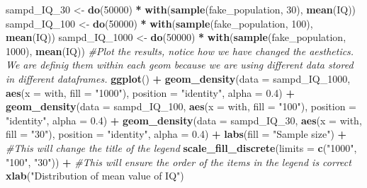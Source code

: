 \documentclass[]{book}
\newenvironment{Shaded}{\begin{snugshade}}{\end{snugshade}}
\newcommand{\CommentTok}[1]{\textcolor[rgb]{0.56,0.35,0.01}{\textit{#1}}}
\newcommand{\DataTypeTok}[1]{\textcolor[rgb]{0.13,0.29,0.53}{#1}}
\newcommand{\DecValTok}[1]{\textcolor[rgb]{0.00,0.00,0.81}{#1}}
\newcommand{\FloatTok}[1]{\textcolor[rgb]{0.00,0.00,0.81}{#1}}
\newcommand{\KeywordTok}[1]{\textcolor[rgb]{0.13,0.29,0.53}{\textbf{#1}}}
\newcommand{\NormalTok}[1]{#1}
\newcommand{\OperatorTok}[1]{\textcolor[rgb]{0.81,0.36,0.00}{\textbf{#1}}}
\newcommand{\StringTok}[1]{\textcolor[rgb]{0.31,0.60,0.02}{#1}}
\theoremstyle{definition}
\theoremstyle{definition}
\theoremstyle{definition}
\theoremstyle{remark}
\begin{document}
\begin{Shaded}
\begin{Highlighting}[]
\NormalTok{sampd_IQ_}\DecValTok{30}\NormalTok{ <-}\StringTok{ }\KeywordTok{do}\NormalTok{(}\DecValTok{50000}\NormalTok{) }\OperatorTok{*}\StringTok{ }\KeywordTok{with}\NormalTok{(}\KeywordTok{sample}\NormalTok{(fake_population, }\DecValTok{30}\NormalTok{), }\KeywordTok{mean}\NormalTok{(IQ))}
\NormalTok{sampd_IQ_}\DecValTok{100}\NormalTok{ <-}\StringTok{ }\KeywordTok{do}\NormalTok{(}\DecValTok{50000}\NormalTok{) }\OperatorTok{*}\StringTok{ }\KeywordTok{with}\NormalTok{(}\KeywordTok{sample}\NormalTok{(fake_population, }\DecValTok{100}\NormalTok{), }\KeywordTok{mean}\NormalTok{(IQ))}
\NormalTok{sampd_IQ_}\DecValTok{1000}\NormalTok{ <-}\StringTok{ }\KeywordTok{do}\NormalTok{(}\DecValTok{50000}\NormalTok{) }\OperatorTok{*}\StringTok{ }\KeywordTok{with}\NormalTok{(}\KeywordTok{sample}\NormalTok{(fake_population, }\DecValTok{1000}\NormalTok{), }\KeywordTok{mean}\NormalTok{(IQ))}
\CommentTok{#Plot the results, notice how we have changed the aesthetics. We are definig them within each geom because we are using different data stored in different dataframes.}
\KeywordTok{ggplot}\NormalTok{() }\OperatorTok{+}\StringTok{ }
\StringTok{    }\KeywordTok{geom_density}\NormalTok{(}\DataTypeTok{data =}\NormalTok{ sampd_IQ_}\DecValTok{1000}\NormalTok{, }\KeywordTok{aes}\NormalTok{(}\DataTypeTok{x =}\NormalTok{ with, }\DataTypeTok{fill =} \StringTok{"1000"}\NormalTok{), }\DataTypeTok{position =} \StringTok{"identity"}\NormalTok{, }\DataTypeTok{alpha =} \FloatTok{0.4}\NormalTok{) }\OperatorTok{+}
\StringTok{   }\KeywordTok{geom_density}\NormalTok{(}\DataTypeTok{data =}\NormalTok{ sampd_IQ_}\DecValTok{100}\NormalTok{, }\KeywordTok{aes}\NormalTok{(}\DataTypeTok{x =}\NormalTok{ with, }\DataTypeTok{fill =} \StringTok{"100"}\NormalTok{), }\DataTypeTok{position =} \StringTok{"identity"}\NormalTok{, }\DataTypeTok{alpha =} \FloatTok{0.4}\NormalTok{) }\OperatorTok{+}
\StringTok{   }\KeywordTok{geom_density}\NormalTok{(}\DataTypeTok{data =}\NormalTok{ sampd_IQ_}\DecValTok{30}\NormalTok{, }\KeywordTok{aes}\NormalTok{(}\DataTypeTok{x =}\NormalTok{ with, }\DataTypeTok{fill =} \StringTok{"30"}\NormalTok{), }\DataTypeTok{position =} \StringTok{"identity"}\NormalTok{, }\DataTypeTok{alpha =} \FloatTok{0.4}\NormalTok{) }\OperatorTok{+}
\StringTok{  }\KeywordTok{labs}\NormalTok{(}\DataTypeTok{fill =} \StringTok{"Sample size"}\NormalTok{) }\OperatorTok{+}\StringTok{ }\CommentTok{#This will change the title of the legend}
\StringTok{  }\KeywordTok{scale_fill_discrete}\NormalTok{(}\DataTypeTok{limits =} \KeywordTok{c}\NormalTok{(}\StringTok{"1000"}\NormalTok{, }\StringTok{"100"}\NormalTok{, }\StringTok{"30"}\NormalTok{)) }\OperatorTok{+}\StringTok{ }\CommentTok{#This will ensure the order of the items in the legend is correct}
\StringTok{  }\KeywordTok{xlab}\NormalTok{(}\StringTok{"Distribution of mean value of IQ"}\NormalTok{)}
\end{Highlighting}
\end{Shaded}
\end{document}
